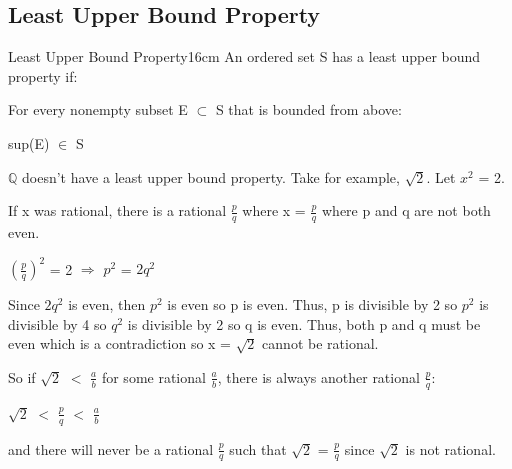 	\newpage



	
\subsection{ Least Upper Bound Property }

	\begin{wtheorem}{Least Upper Bound Property}{16cm}
		An ordered set S has a least upper bound property if:

		\hspace{0.5cm}
		For every nonempty subset E $ \subset $ S that is bounded from above:

		\hspace{1cm}
		sup(E) $\in$ S
	\end{wtheorem}

	\vspace{0.5cm}



	\begin{example}
		$\mathbb{Q}$ doesn't have a least upper bound property.
		Take for example, $\sqrt{2}$.
		Let $x^2$ = 2.

		If x was rational, there is a rational $\frac{p}{q}$
		where x = $\frac{p}{q}$ where p and q are not both even.

		\hspace{0.5cm}
		$(\frac{p}{q})^2$ = 2
		\hspace{1cm}
		$\Rightarrow$
		\hspace{1cm}
		$p^2$ = $2q^2$

		Since $2q^2$ is even, then $p^2$ is even so p is even.
		Thus, p is divisible by 2 so $p^2$ is divisible by 4
		so $q^2$ is divisible by 2 so q is even.
		Thus, both p and q must be even which is a contradiction
		so x = $\sqrt{2}$ cannot be rational. 
		
		So if $\sqrt{2}$ $<$ $\frac{a}{b}$
		for some rational $\frac{a}{b}$, there is always another
		rational $\frac{p}{q}$:

		\hspace{0.5cm}
		$\sqrt{2}$ $<$ $\frac{p}{q}$ $<$ $\frac{a}{b}$

		and there will never be a rational $\frac{p}{q}$ such that
		$\sqrt{2}$ = $\frac{p}{q}$ since $\sqrt{2}$ is not rational.
	\end{example}

